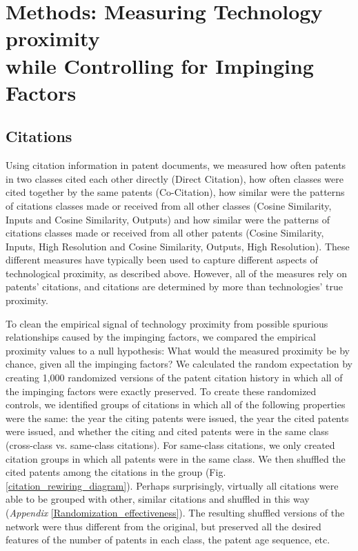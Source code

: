 \documentclass[]{svjour3}
\begin{document}
\section{Methods: Measuring Technology proximity \\while Controlling for Impinging Factors}

\subsection{Citations}
Using citation information in patent documents, we measured how often patents in two classes cited each other directly (Direct Citation), how often classes were cited together by the same patents (Co-Citation), how similar were the patterns of citations classes made or received from all other classes (Cosine Similarity, Inputs and Cosine Similarity, Outputs) and how similar were the patterns of citations classes made or received from all other patents (Cosine Similarity, Inputs, High Resolution and Cosine Similarity, Outputs, High Resolution). These different measures have typically been used to capture different aspects of technological proximity, as described above. However, all of the measures rely on patents' citations, and citations are determined by more than technologies' true proximity.

To clean the empirical signal of technology proximity from possible spurious relationships caused by the impinging factors, we compared the empirical proximity values to a null hypothesis: What would the measured proximity be by chance, given all the impinging factors? We calculated the random expectation by creating 1,000 randomized versions of the patent citation history in which all of the impinging factors were exactly preserved. To create these randomized controls, we identified groups of citations in which all of the following properties were the same: the year the citing patents were issued, the year the cited patents were issued, and whether the citing and cited patents were in the same class (cross-class vs. same-class citations). For same-class citations, we only created citation groups in which all patents were in the same class. We then shuffled the cited patents among the citations in the group (Fig. \ref{citation_rewiring_diagram}). Perhaps surprisingly, virtually all citations were able to be grouped with other, similar citations and shuffled in this way (\textit{Appendix} \ref{Randomization_effectiveness}). The resulting shuffled versions of the network were thus different from the original, but preserved all the desired features of the number of patents in each class, the patent age sequence, etc. 
\end{document}
